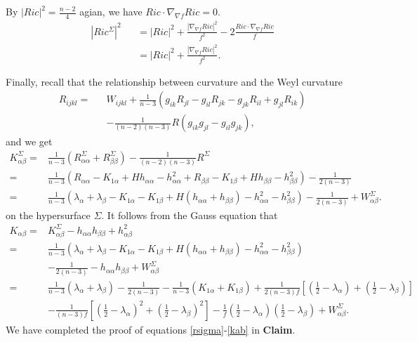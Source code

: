 \documentclass[12pt]{amsart}
\newcommand{\ban}{\begin{eqnarray*}}
\newcommand{\ean}{\end{eqnarray*}}
\begin{document}
	\smallskip
	By $|Ric|^2=\frac{n-2}{4}$ agian, we have $Ric\cdot\nabla_{\nabla f}Ric=0$.
	\ban
	|Ric^{\Sigma}|^2&&=|Ric|^2+\frac{|\nabla_{\nabla f} Ric|^2}{f^2}-2\frac{Ric\cdot\nabla_{\nabla f}Ric}{f}\\
	&&=|Ric|^2+\frac{|\nabla_{\nabla f} Ric|^2}{f^2}.
	\ean
	
	Finally, recall that the relationship between curvature and the Weyl curvature
	\ban
	R_{ijkl}=&&W_{ijkl}+{\frac{1}{n-3}}(g_{ik}R_{jl}-g_{il}R_{jk}-g_{jk}R_{il}+g_{jl}R_{ik})\\
	&&-{\frac{1}{(n-2)(n-3)}}R(g_{ik}g_{jl}-g_{il}g_{jk}),
	\ean
	and we get
	\begin{equation*}
	\begin{aligned}
	K^{\Sigma}_{\alpha \beta }=&{\frac{1}{n-3}}(R^{\Sigma}_{\alpha \alpha }+R^{\Sigma}_{\beta \beta})-{\frac{1}{(n-2)(n-3)}}R^{\Sigma}\\
	=&{\frac{1}{n-3}}(R_{\alpha \alpha}-K_{1\alpha }+Hh_{\alpha \alpha}-h_{\alpha \alpha}^2+R_{\beta \beta}-K_{1\beta}+Hh_{\beta \beta }-h_{\beta \beta}^2)-{\frac{1}{2(n-3)}}\\
	=&{\frac{1}{n-3}}\left(\lambda_{\alpha}+\lambda_{\beta}-K_{1\alpha }-K_{1\beta  }+H(h_{\alpha \alpha}+h_{\beta \beta })-h_{\alpha \alpha}^2-h_{\beta \beta}^2\right)-{\frac{1}{2(n-3)}}+W^{\Sigma}_{\alpha \beta }.
	\end{aligned}
	\end{equation*}
	on the  hypersurface $\Sigma$. It follows from the Gauss equation that
	\begin{equation*}
	\begin{aligned}
	K_{\alpha \beta }=&K^{\Sigma}_{\alpha \beta }-h_{\alpha \alpha}h_{\beta \beta}+h_{\alpha \beta }^2\\
	=&{\frac{1}{n-3}}\left(\lambda_{\alpha}+\lambda_{\beta}-K_{1\alpha }-K_{1\beta }+H(h_{\alpha \alpha}+h_{\beta \beta })-h_{\alpha \alpha}^2-h_{\beta \beta}^2\right)\\
	&-{\frac{1}{2(n-3)}}-h_{\alpha \alpha}h_{\beta \beta}+W^{\Sigma}_{\alpha \beta }\\
	=&{\frac{1}{n-3}}(\lambda_{\alpha}+\lambda_{\beta})-{\frac{1}{2(n-3)}}-{\frac{1}{n-3}}(K_{1\alpha }+K_{1\beta  })+{\frac{1}{2(n-3)f}}[({\frac{1}{2}}-\lambda_{\alpha })+({\frac{1}{2}}-\lambda_{\beta})]\\
	&- {\frac{1}{(n-3)f}}\left[ ({\frac{1}{2}}-\lambda_{\alpha})^2+({\frac{1}{2}}-\lambda_{\beta})^2\right]  -{\frac{1}{f}}({\frac{1}{2}}-\lambda_{\alpha})({\frac{1}{2}}-\lambda_{\beta})+W^{\Sigma}_{\alpha \beta }.
	\end{aligned}
	\end{equation*}
	We have completed the proof of equations \eqref{rsigma}-\eqref{kab} in \textbf{Claim}.\\
	
\end{document}
